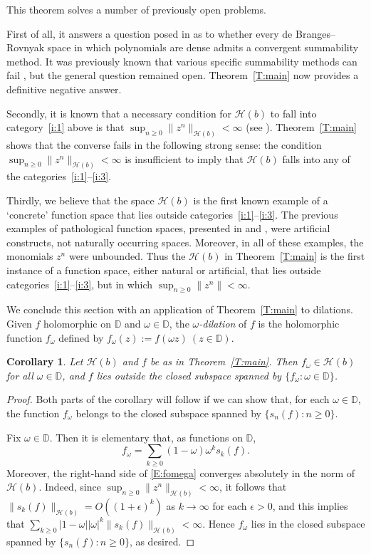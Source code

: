 \documentclass[11pt,reqno]{amsart}
\theoremstyle{plain}
\newtheorem{corollary}[theorem]{Corollary}
\theoremstyle{definition}
\theoremstyle{remark}
\newcommand{\cH}{\mathcal{H}}
\newcommand{\DD}{\mathbb{D}}
\begin{document}
This theorem solves a number of previously open problems.

First of all, it answers a question posed in \cite{MR18}
as to whether every de Branges--Rovnyak space
in which polynomials are dense admits a convergent
summability method. It was previously known that
various specific summability methods can fail
\cite{EFKMR16, GMR24, MPR22b, MR18}, but the general question remained open.
Theorem~\ref{T:main} now provides a definitive negative answer.

Secondly, it is known
that a necessary condition
for $\cH(b)$ to fall into category~\ref{i:1} above
is that $\sup_{n\ge0}\|z^n\|_{\cH(b)}<\infty$
(see \cite[Corollary~6.11]{GMR24}).
Theorem~\ref{T:main} shows that the converse fails
in the following strong sense: 
the condition $\sup_{n\ge0}\|z^n\|_{\cH(b)}<\infty$
is insufficient to imply that $\cH(b)$ falls into 
any of the  categories~\ref{i:1}--\ref{i:3}.


Thirdly, we believe that the space $\cH(b)$ is the
first known example of a `concrete' function space that lies outside
categories~\ref{i:1}--\ref{i:3}.
The previous examples of pathological function spaces,  
presented in  \cite{MPR22a} and \cite{MR19}, were 
arti\-ficial constructs, not naturally occurring spaces.
Moreover, in all of these examples, the monomials $z^n$
were unbounded. Thus the  $\cH(b)$ in Theorem~\ref{T:main}
is  the first instance of a function space,
either natural or artificial, 
that lies outside categories~\ref{i:1}--\ref{i:3},
but in which $\sup_{n\ge0}\|z^n\|<\infty$.


We conclude this section with an application
of Theorem~\ref{T:main} to dilations.
Given $f$ holomorphic on $\DD$ and $\omega\in\DD$,
the \emph{$\omega$-dilation} of $f$ is the holomorphic function $f_\omega$ defined by $f_\omega(z):=f(\omega z)~(z\in\DD)$.

\begin{corollary}\label{C:dilate}
Let $\cH(b)$ and $f$ be as in Theorem~\ref{T:main}.
Then $f_\omega\in\cH(b)$ for all $\omega\in\DD$,
and $f$ lies outside the closed subspace spanned
by $\{f_\omega:\omega\in\DD\}$.
\end{corollary}

\begin{proof}
Both parts of the corollary will follow if we can show that,
for each $\omega\in\DD$,
the function $f_\omega$ belongs to the closed subspace spanned
by $\{s_n(f):n\ge0\}$. 

Fix $\omega\in\DD$. Then it is elementary
that, as functions on $\DD$,
\begin{equation}\label{E:fomega}
f_\omega=\sum_{k\ge0}(1-\omega)\omega^ks_k(f).
\end{equation}
Moreover, the right-hand side of \eqref{E:fomega} converges
absolutely in the norm of $\cH(b)$. Indeed, since $\sup_{n\ge0}\|z^n\|_{\cH(b)}<\infty$, it follows that $\|s_k(f)\|_{\cH(b)}=O((1+\epsilon)^k)$ as $k\to\infty$ for each $\epsilon>0$, and this implies that 
$\sum_{k\ge0}|1-\omega||\omega|^k\|s_k(f)\|_{\cH(b)}<\infty$.
Hence $f_\omega$ lies in the closed subspace spanned
by $\{s_n(f):n\ge0\}$, as desired.
\end{proof}
\end{document}
